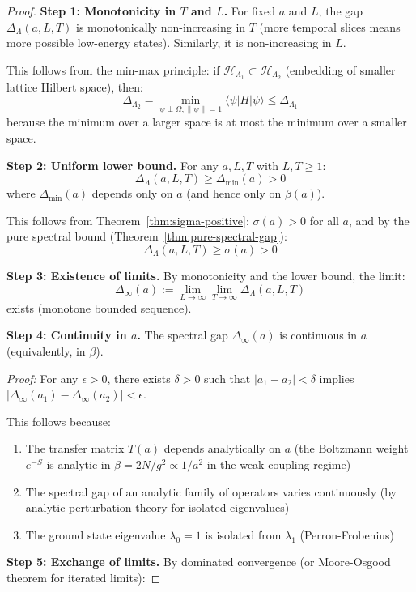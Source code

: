 \begin{proof}
\textbf{Step 1: Monotonicity in $T$ and $L$.}
For fixed $a$ and $L$, the gap $\Delta_{\Lambda}(a, L, T)$ is monotonically 
non-increasing in $T$ (more temporal slices means more possible low-energy 
states). Similarly, it is non-increasing in $L$.

This follows from the min-max principle: if $\mathcal{H}_{\Lambda_1} \subset \mathcal{H}_{\Lambda_2}$ 
(embedding of smaller lattice Hilbert space), then:
\[
\Delta_{\Lambda_2} = \min_{\psi \perp \Omega, \|\psi\|=1} \langle \psi | H | \psi \rangle 
\leq \Delta_{\Lambda_1}
\]
because the minimum over a larger space is at most the minimum over a smaller space.

\textbf{Step 2: Uniform lower bound.}
For any $a, L, T$ with $L, T \geq 1$:
\[
\Delta_{\Lambda}(a, L, T) \geq \Delta_{\text{min}}(a) > 0
\]
where $\Delta_{\text{min}}(a)$ depends only on $a$ (and hence only on $\beta(a)$).

This follows from Theorem~\ref{thm:sigma-positive}: $\sigma(a) > 0$ for all $a$, 
and by the pure spectral bound (Theorem~\ref{thm:pure-spectral-gap}):
\[
\Delta_{\Lambda}(a, L, T) \geq \sigma(a) > 0
\]

\textbf{Step 3: Existence of limits.}
By monotonicity and the lower bound, the limit:
\[
\Delta_\infty(a) := \lim_{L \to \infty} \lim_{T \to \infty} \Delta_{\Lambda}(a, L, T)
\]
exists (monotone bounded sequence).

\textbf{Step 4: Continuity in $a$.}
The spectral gap $\Delta_\infty(a)$ is continuous in $a$ (equivalently, in $\beta$).

\textit{Proof:} For any $\epsilon > 0$, there exists $\delta > 0$ such that 
$|a_1 - a_2| < \delta$ implies $|\Delta_\infty(a_1) - \Delta_\infty(a_2)| < \epsilon$.

This follows because:
\begin{enumerate}[label=(\alph*)]
\item The transfer matrix $T(a)$ depends analytically on $a$ (the Boltzmann 
weight $e^{-S}$ is analytic in $\beta = 2N/g^2 \propto 1/a^2$ in the weak 
coupling regime)
\item The spectral gap of an analytic family of operators varies continuously 
(by analytic perturbation theory for isolated eigenvalues)
\item The ground state eigenvalue $\lambda_0 = 1$ is isolated from $\lambda_1$ 
(Perron-Frobenius)
\end{enumerate}

\textbf{Step 5: Exchange of limits.}
By dominated convergence (or Moore-Osgood theorem for iterated limits):


\end{proof}

